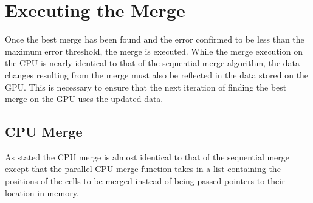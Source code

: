 \section{Executing the Merge}
Once the best merge has been found and the error confirmed to be less than the maximum error threshold, the merge is executed. While the merge execution on the CPU is nearly identical to that of the sequential merge algorithm, the data changes resulting from the merge must also be reflected in the data stored on the GPU. This is necessary to ensure that the next iteration of finding the best merge on the GPU uses the updated data.

\subsection{CPU Merge}
As stated the CPU merge is almost identical to that of the sequential merge except that the parallel CPU merge function takes in a list containing the positions of the cells to be merged instead of being passed pointers to their location in memory.


